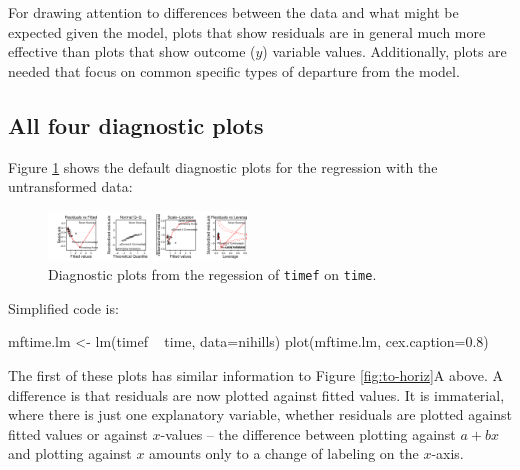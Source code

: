 \documentclass{tufte-book}\usepackage[]{graphicx}\usepackage[]{color}
\newcommand{\txtt}[1]{\texttt{#1}}
\begin{document}
For drawing attention to differences between the data and what might
be expected given the model, plots that show residuals are in general
much more effective than plots that show outcome ($y$) variable
values. Additionally, plots are needed that focus on common specific
types of departure from the model.

\subsection*{All four diagnostic plots}
Figure \ref{fig:diag-mftime} shows the default
diagnostic plots for the regression with the untransformed data:

\begin{figure}
\begin{Schunk}


\centerline{\includegraphics[width=0.47\textwidth]{figs/11-diag-mf-1} }

\end{Schunk}
\caption{Diagnostic plots from the regession of \txtt{timef} on
  \txtt{time}.}\label{fig:diag-mftime}
\end{figure}
\noindent
Simplified code is:
\begin{Schunk}
\begin{Sinput}
mftime.lm <- lm(timef ~ time, data=nihills)
plot(mftime.lm, cex.caption=0.8)
\end{Sinput}
\end{Schunk}
The first of these plots has similar information to Figure \ref{fig:to-horiz}A
above.  A difference is that residuals are now plotted against fitted
values.  It is immaterial, where there is just one explanatory variable,
whether residuals are plotted against fitted values or against
$x$-values -- the difference between plotting against $a + b x$ and
plotting against $x$ amounts only to a change of labeling on the
$x$-axis.
\end{document}
